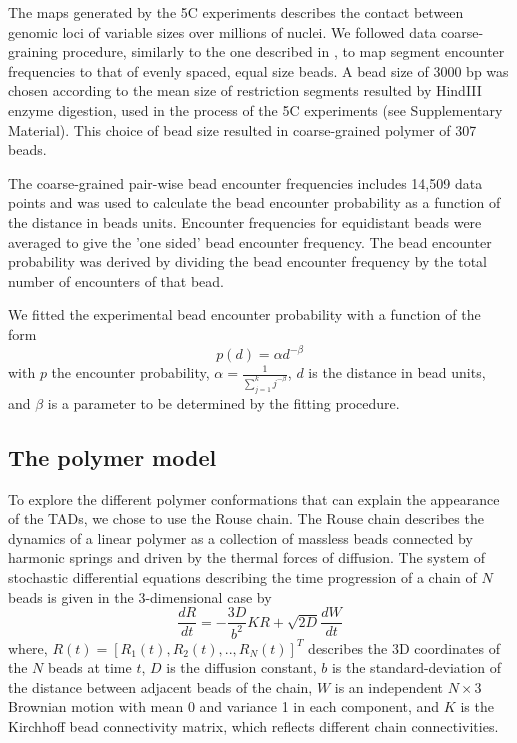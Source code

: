 \documentclass[12pt]{paper}
\begin{document}
The maps generated by the 5C experiments describes the contact between genomic loci of variable sizes over millions of nuclei. We followed data coarse-graining procedure, similarly to the one described in \cite{Giorgetti2014}, to map segment encounter frequencies to that of evenly spaced, equal size beads. A bead size of 3000 bp was chosen according to the mean size of restriction segments resulted by HindIII enzyme digestion, used in the process of the 5C experiments (see \cite{Giorgetti2014} Supplementary Material). This choice of bead size resulted in coarse-grained polymer of 307 beads. 

The coarse-grained pair-wise bead encounter frequencies includes 14,509 data points and was used to calculate the bead encounter probability as a function of the distance in beads units. Encounter frequencies for equidistant beads were averaged to give the 'one sided' bead encounter frequency. The bead encounter probability was derived by dividing the bead encounter frequency by the total number of encounters of that bead. 

We fitted the experimental bead encounter probability with a function of the form 
\begin{equation}\label{equation_encounterProbabilityModel}
p(d)=\alpha d^{-\beta}
\end{equation}
with $p$ the encounter probability, $\alpha = \frac{1}{\sum_{j=1}^k j^{-\beta}}$, $d$ is the distance in bead units, and $\beta$ is a parameter to be determined by the fitting procedure.


\subsection{The polymer model}\label{subsection_thePolymerModel}
To explore the different polymer conformations that can explain the appearance of the TADs, we chose to use the Rouse chain. The Rouse chain describes the dynamics of a linear polymer as a collection of massless beads connected by harmonic springs and driven by the thermal forces of diffusion. The system of stochastic differential equations describing the time progression of a chain of $N$ beads is given in the 3-dimensional case by
\begin{equation}
\frac{dR}{dt}=-\frac{3D}{b^2}KR +\sqrt{2D}\frac{dW}{dt}
\end{equation}
where, $R(t)=[R_1(t),R_2(t),..,R_N(t)]^T$ describes the 3D coordinates of the $N$ beads at time $t$, $D$ is the diffusion constant, $b$ is the standard-deviation of the distance between adjacent beads of the chain, $W$ is an independent $N\times3$ Brownian motion with mean 0 and variance 1 in each component, and $K$ is the Kirchhoff bead connectivity matrix, which reflects different chain connectivities. 
\end{document}

